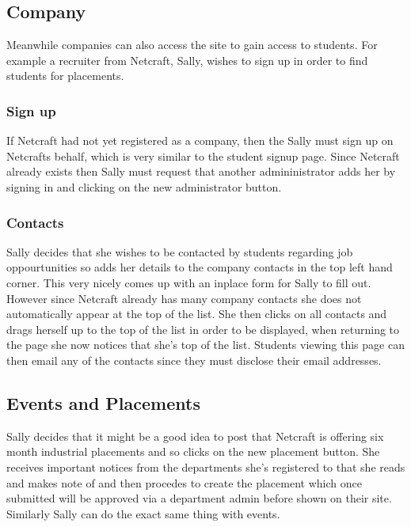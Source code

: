 \subsection{Company}
Meanwhile companies can also access the site to gain access to students. For example a recruiter from Netcraft, Sally, wishes to sign up in order to find students for placements.
  \subsubsection{Sign up}
    If Netcraft had not yet registered as a company, then the Sally must sign up on Netcrafts behalf, which is very similar to the student signup page.
    Since Netcraft already exists then Sally must request that another admininistrator adds her by signing in and clicking on the new administrator button.

  \subsubsection{Contacts}
    Sally decides that she wishes to be contacted by students regarding job oppourtunities so adds her details to the company contacts in the top left hand corner. This very nicely comes up with an inplace form for Sally to fill out. However since Netcraft already has many company contacts she does not automatically appear at the top of the list. 
    She then clicks on all contacts and drags herself up to the top of the list in order to be displayed, when returning to the page she now notices that she's top of the list.
    Students viewing this page can then email any of the contacts since they must disclose their email addresses.

  \subsection{Events and Placements}
    Sally decides that it might be a good idea to post that Netcraft is offering six month industrial placements and so clicks on the new placement button. 
    She receives important notices from the departments she's registered to that she reads and makes note of and then procedes to create the placement which once submitted will be approved via a department admin before shown on their site.
    Similarly Sally can do the exact same thing with events.
  
